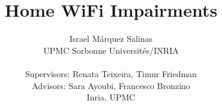\documentclass[sigconf]{Template}
\begin{document}
\title{Home WiFi Impairments}
\author{Israel M\'{a}rquez Salinas \\UPMC Sorbonne Universit\'{e}s/INRIA \\\\ { Supervisors: Renata Teixeira, Timur Friedman}\\ {Advisors: Sara Ayoubi, Francesco Bronzino} \\{Inria, UPMC} }

\maketitle








%



\end{document}
